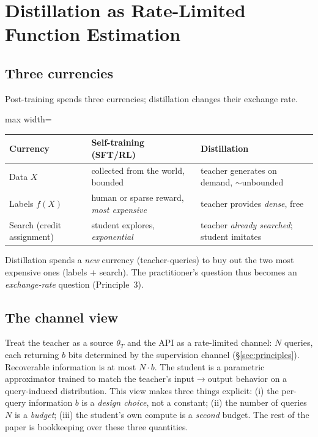\documentclass[11pt]{article}
\begin{document}
\section{Distillation as Rate-Limited Function Estimation}
\label{sec:framework}

\subsection{Three currencies}
Post-training spends three currencies; distillation changes their exchange rate.
\begin{center}
\begin{adjustbox}{max width=\linewidth}
\begin{tabular}{@{}lll@{}}
\toprule
\textbf{Currency} & \textbf{Self-training (SFT/RL)} & \textbf{Distillation} \\
\midrule
Data $X$ & collected from the world, bounded & teacher generates on demand, $\sim$unbounded \\
Labels $f(X)$ & human or sparse reward, \emph{most expensive} & teacher provides \emph{dense}, free \\
Search (credit assignment) & student explores, \emph{exponential} & teacher \emph{already searched}; student imitates \\
\bottomrule
\end{tabular}
\end{adjustbox}
\end{center}
Distillation spends a \emph{new} currency (teacher-queries) to buy out the two most expensive ones (labels $+$ search). The practitioner's question thus becomes an \emph{exchange-rate} question (Principle~3).

\subsection{The channel view}
Treat the teacher as a source $\theta_T$ and the API as a rate-limited channel: $N$ queries, each returning $b$ bits determined by the supervision channel (\S\ref{sec:principles}). Recoverable information is at most $N\!\cdot\! b$. The student is a parametric approximator trained to match the teacher's input$\rightarrow$output behavior on a query-induced distribution. This view makes three things explicit: (i) the per-query information $b$ is a \emph{design choice}, not a constant; (ii) the number of queries $N$ is a \emph{budget}; (iii) the student's own compute is a \emph{second} budget. The rest of the paper is bookkeeping over these three quantities.
\end{document}
